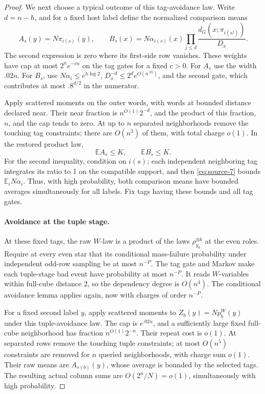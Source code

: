 \begin{proof}
We next choose a typical outcome of this tag-avoidance law. Write \(d=n-h\), and for a fixed host label define the normalized comparison means
\[
 A_s(y)=N\pi_{i(s)}(y),\qquad
 B_s(x)=N\alpha_{i(s)}(x)
       \prod_{j\le d}\frac{d_G(x;\pi_{i(s^j)})}{D_x}.
\]
The second expression is zero where its first-side row vanishes. These weights have cap at most \(2^ne^{-cn}\) on the tag gates for a fixed \(c>0\). For \(A_s\) use the width \(.02n\). For \(B_s\), use \(N\alpha_i\le e^{h\log2}\), \(D_x^{-d}\le2^de^{O(n^{.05})}\), and the second gate, which contributes at most \(.8^{d/2}\) in the numerator.

Apply scattered moments on the outer words, with words at bounded distance declared near. Their near fraction is \(n^{O(1)}2^{-d}\), and the product of this fraction, \(n\), and the cap tends to zero. At up to \(n\) separated neighborhoods remove the touching tag constraints; there are \(O(n^3)\) of them, with total charge \(o(1)\). In the restored product law,
\[
 \mathbb E A_s\le K,\qquad \mathbb E B_s\le K.
\]
For the second inequality, condition on \(i(s)\); each independent neighboring tag integrates its ratio to 1 on the compatible support, and then \eqref{eq:source-7} bounds \(\mathbb E_iN\alpha_i\). Thus, with high probability, both comparison means have bounded averages simultaneously for all labels. Fix tags having these bounds and all tag gates.

\paragraph{Avoidance at the tuple stage.}
At these fixed tags, the raw \(W\)-law is a product of the laws \(\rho_{y_0}^{\otimes k}\) at the even roles. Require at every even star that its conditional mass-failure probability under independent odd-row sampling be at most \(n^{-P}\). The tag gate and Markov make each tuple-stage bad event have probability at most \(n^{-P}\). It reads \(W\)-variables within full-cube distance 2, so the dependency degree is \(O(n^4)\). The conditional avoidance lemma applies again, now with charges of order \(n^{-P}\).

For a fixed second label \(y\), apply scattered moments to
\(Z_b(y)=Np_b^W(y)\)
under this tuple-avoidance law. The cap is \(e^{.02n}\), and a sufficiently large fixed full-cube neighborhood has fraction \(n^{O(1)}2^{-n}\). Their repeat cost is \(o(1)\). At separated rows remove the touching tuple constraints; at most \(O(n^5)\) constraints are removed for \(n\) queried neighborhoods, with charge sum \(o(1)\). Their raw means are \(A_{s(b)}(y)\), whose average is bounded by the selected tags. The resulting actual column sums are \(O(2^n/N)=o(1)\), simultaneously with high probability.


\end{proof}
